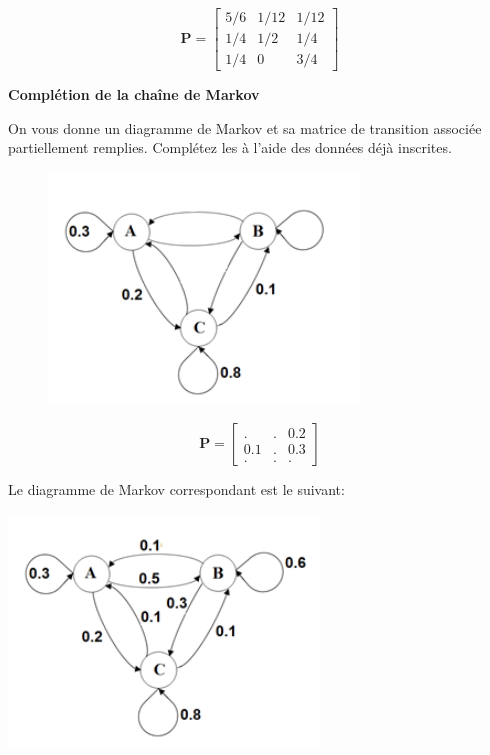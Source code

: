 \[ 
\mathbf{P} =
\begin{bmatrix}
5/6 & 1/12 & 1/12 \\
1/4 & 1/2 & 1/4 \\
1/4 & 0 & 3/4
\end{bmatrix}
\]

\newpage

\begin{Exercice}[5 minutes]\textbf{Complétion de la chaîne de Markov}

On vous donne un diagramme de Markov et sa matrice de transition associée partiellement remplies. Complétez les à l'aide des données déjà inscrites.

\begin{figure}[h!]
	   \centering
	   \includegraphics[width=.7\textwidth]{resources/Markov_incomplete.png}
\end{figure}

	\[ 
		\mathbf{P} =
		\begin{bmatrix}
		. & . & 0.2 \\
		0.1 & . & 0.3 \\
		. & . & .
		\end{bmatrix}
	\]

\begin{solution}
        Le diagramme de Markov correspondant est le suivant:

	
	    \centering
	    \includegraphics[width=.7\textwidth]{solutions/Markov_complete.png}
	

\end{solution}
\end{Exercice}

